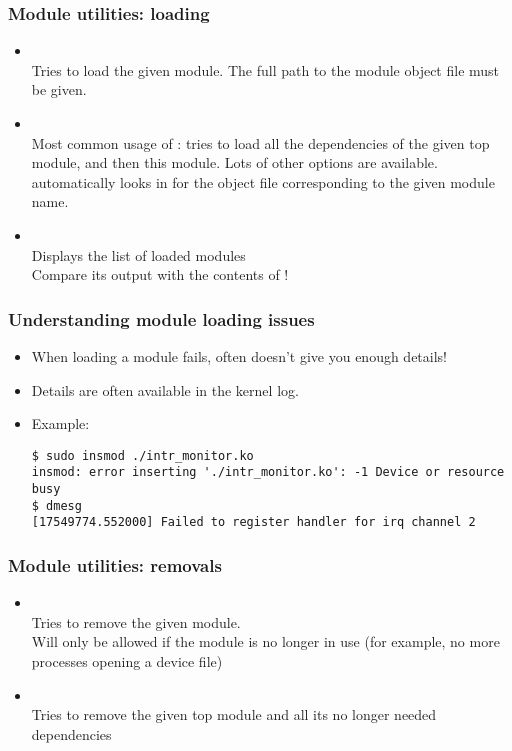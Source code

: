 \begin{frame}
  \frametitle{Module utilities: loading}
  \begin{itemize}
  \item {}\\
    Tries to load the given module. The full path to the module object
    file must be given.
  \item {}\\
    Most common usage of : tries to load all the
    dependencies of the given top module, and then this module. Lots of
    other options are available.  automatically looks in
     for the object file corresponding
    to the given module name.
  \item {}\\
    Displays the list of loaded modules\\
    Compare its output with the contents of !
  \end{itemize}
\end{frame}

\begin{frame}[fragile]
  \frametitle{Understanding module loading issues}
  \begin{itemize}
  \item When loading a module fails,  often doesn't give
    you enough details!
  \item Details are often available in the kernel log.
  \item Example:\\
\scriptsize
\begin{verbatim}
$ sudo insmod ./intr_monitor.ko
insmod: error inserting './intr_monitor.ko': -1 Device or resource busy
$ dmesg
[17549774.552000] Failed to register handler for irq channel 2
\end{verbatim}
  \end{itemize}
\end{frame}

\begin{frame}
  \frametitle{Module utilities: removals}
  \begin{itemize}
  \item {}\\
    Tries to remove the given module.\\
    Will only be allowed if the module is no longer in use (for
    example, no more processes opening a device file)
  \item {}\\
    Tries to remove the given top module and all its no longer needed dependencies
  \end{itemize}
\end{frame}

